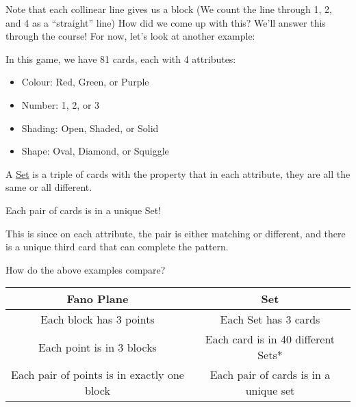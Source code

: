 \begin{minipage}{\textwidth}
    \centering
\end{minipage}
Note that each collinear line gives us a block (We count the line through 1, 2, and 4 as a ``straight'' line)
How did we come up with this?
We'll answer this through the course!
For now, let's look at another example:

\begin{example}
    In this game, we have 81 cards, each with 4 attributes:
    \begin{itemize}
        \item Colour: Red, Green, or Purple
        \item Number: 1, 2, or 3
        \item Shading: Open, Shaded, or Solid
        \item Shape: Oval, Diamond, or Squiggle
    \end{itemize}
    
    A \ul{Set} is a triple of cards with the property that in each attribute, they are all the same or all different.

    \begin{note}
        Each pair of cards is in a unique Set!
    \end{note}
    This is since on each attribute, the pair is either matching or different, and there is a unique third card that can complete the pattern.
\end{example}

How do the above examples compare?

\begin{minipage}{\textwidth}
    \begin{center}        
    \begin{tabular}{c|c}
        Fano Plane & Set \\
        \hline
        Each block has 3 points & Each Set has 3 cards \\
        Each point is in 3 blocks & Each card is in 40 different Sets* \\
        Each pair of points is in exactly one block & Each pair of cards is in a unique set
    \end{tabular}
    \end{center}
\end{minipage}


